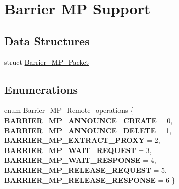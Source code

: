 \hypertarget{group__ClassicBarrierMP}{}\section{Barrier MP Support}
\label{group__ClassicBarrierMP}
\subsection*{Data Structures}
\begin{DoxyCompactItemize}
\item 
struct \mbox{\hyperlink{structBarrier__MP__Packet}{Barrier\+\_\+\+M\+P\+\_\+\+Packet}}
\end{DoxyCompactItemize}
\subsection*{Enumerations}
\begin{DoxyCompactItemize}
\item 
enum \mbox{\hyperlink{group__ClassicBarrierMP_ga14a42806fd76d110a17d806124a892d0}{Barrier\+\_\+\+M\+P\+\_\+\+Remote\+\_\+operations}} \{ \newline
{\bfseries B\+A\+R\+R\+I\+E\+R\+\_\+\+M\+P\+\_\+\+A\+N\+N\+O\+U\+N\+C\+E\+\_\+\+C\+R\+E\+A\+TE} = 0, 
{\bfseries B\+A\+R\+R\+I\+E\+R\+\_\+\+M\+P\+\_\+\+A\+N\+N\+O\+U\+N\+C\+E\+\_\+\+D\+E\+L\+E\+TE} = 1, 
{\bfseries B\+A\+R\+R\+I\+E\+R\+\_\+\+M\+P\+\_\+\+E\+X\+T\+R\+A\+C\+T\+\_\+\+P\+R\+O\+XY} = 2, 
{\bfseries B\+A\+R\+R\+I\+E\+R\+\_\+\+M\+P\+\_\+\+W\+A\+I\+T\+\_\+\+R\+E\+Q\+U\+E\+ST} = 3, 
\newline
{\bfseries B\+A\+R\+R\+I\+E\+R\+\_\+\+M\+P\+\_\+\+W\+A\+I\+T\+\_\+\+R\+E\+S\+P\+O\+N\+SE} = 4, 
{\bfseries B\+A\+R\+R\+I\+E\+R\+\_\+\+M\+P\+\_\+\+R\+E\+L\+E\+A\+S\+E\+\_\+\+R\+E\+Q\+U\+E\+ST} = 5, 
{\bfseries B\+A\+R\+R\+I\+E\+R\+\_\+\+M\+P\+\_\+\+R\+E\+L\+E\+A\+S\+E\+\_\+\+R\+E\+S\+P\+O\+N\+SE} = 6
 \}
\end{DoxyCompactItemize}
